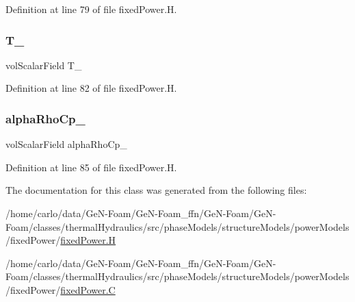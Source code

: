 Definition at line 79 of file fixed\+Power.\+H.

\mbox{\label{classFoam_1_1powerModels_1_1fixedPower_a97c6919892227364774ffd51f3fa625b}} 
\subsubsection{\texorpdfstring{T\+\_\+}{T\_}}
{\footnotesize\ttfamily vol\+Scalar\+Field T\+\_\+\hspace{0.3cm}{\ttfamily [protected]}}



Definition at line 82 of file fixed\+Power.\+H.

\mbox{\label{classFoam_1_1powerModels_1_1fixedPower_ad4f662273df48e473e52b6043705b080}} 
\subsubsection{\texorpdfstring{alpha\+Rho\+Cp\+\_\+}{alphaRhoCp\_}}
{\footnotesize\ttfamily vol\+Scalar\+Field alpha\+Rho\+Cp\+\_\+\hspace{0.3cm}{\ttfamily [protected]}}



Definition at line 85 of file fixed\+Power.\+H.



The documentation for this class was generated from the following files\+:\begin{DoxyCompactItemize}
\item 
/home/carlo/data/\+Ge\+N-\/\+Foam/\+Ge\+N-\/\+Foam\+\_\+ffn/\+Ge\+N-\/\+Foam/\+Ge\+N-\/\+Foam/classes/thermal\+Hydraulics/src/phase\+Models/structure\+Models/power\+Models/fixed\+Power/\hyperlink{fixedPower_8H}{fixed\+Power.\+H}\item 
/home/carlo/data/\+Ge\+N-\/\+Foam/\+Ge\+N-\/\+Foam\+\_\+ffn/\+Ge\+N-\/\+Foam/\+Ge\+N-\/\+Foam/classes/thermal\+Hydraulics/src/phase\+Models/structure\+Models/power\+Models/fixed\+Power/\hyperlink{fixedPower_8C}{fixed\+Power.\+C}\end{DoxyCompactItemize}
